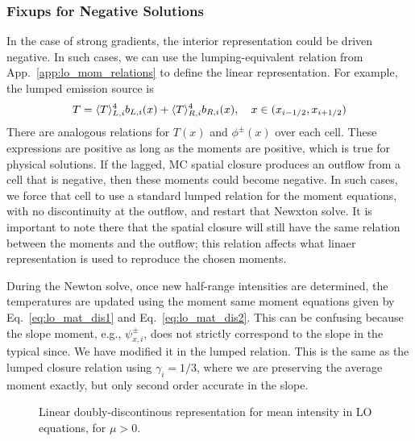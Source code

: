 \subsubsection{Fixups for Negative Solutions}

In the case of strong gradients, the interior representation could be driven
negative.  In such cases, we can use the lumping-equivalent relation from
App.~\ref{app:lo_mom_relations} to define the linear representation.  For
example, the lumped emission source is
\begin{equation}
    T = \langle T \rangle_{L,i}^4 b_{L,i}(x) + \langle T \rangle_{R,i}^4 b_{R,i}(x) , \quad x\in({x_{i-1/2}},{x_{i+1/2}})
\end{equation}
There are analogous relations for $T(x)$ and $\phi^\pm(x)$ over each cell.
These expressions are positive as long as the moments are positive, which is true for
physical solutions.  If the lagged, MC spatial closure produces an outflow from a cell that is
negative, then these moments could become negative.  In such cases, we force that cell to
use a standard lumped relation for the moment equations, with no discontinuity at the
outflow, and restart that Newxton solve.  It is important to note there that the spatial closure will still have the same
relation between the moments and the outflow; this relation affects what linaer
representation is used to reproduce the chosen moments.

During the Newton solve, once new half-range
intensities are determined, the temperatures are updated using the moment same moment
equations given by Eq.~\eqref{eq:lo_mat_dis1} and Eq.~\eqref{eq:lo_mat_dis2}. This can be confusing because the slope moment,
e.g., $\psi_{x,i}^\pm$, does not strictly correspond to the slope in the typical since.
We have modified it in the lumped relation.  This is the same as the lumped closure relation using
$\gamma_i=1/3$, where we are preserving the average moment exactly, but only second order
accurate in the slope.

\begin{figure}[H]
    \centering
    {}
    \caption{Linear doubly-discontinous representation for mean intensity in LO equations,
    for $\mu>0$.}
    \label{fig:ldd_space}
\end{figure}


